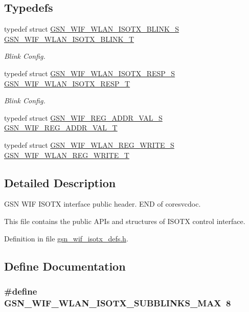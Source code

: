 \subsection*{Typedefs}
\begin{DoxyCompactItemize}
\item 
typedef struct \hyperlink{a00383}{GSN\_\-WIF\_\-WLAN\_\-ISOTX\_\-BLINK\_\-S} \hyperlink{a00611_aa5106f5574b37c3ad57646e430fd02cd}{GSN\_\-WIF\_\-WLAN\_\-ISOTX\_\-BLINK\_\-T}
\begin{DoxyCompactList}\small\item\em Blink Config. \end{DoxyCompactList}\item 
typedef struct \hyperlink{a00384}{GSN\_\-WIF\_\-WLAN\_\-ISOTX\_\-RESP\_\-S} \hyperlink{a00611_ab22302300b256ca3328249fa728e3bb7}{GSN\_\-WIF\_\-WLAN\_\-ISOTX\_\-RESP\_\-T}
\begin{DoxyCompactList}\small\item\em Blink Config. \end{DoxyCompactList}\item 
typedef struct \hyperlink{a00343}{GSN\_\-WIF\_\-REG\_\-ADDR\_\-VAL\_\-S} \hyperlink{a00611_a906005e2909b6c0c567780b355483f49}{GSN\_\-WIF\_\-REG\_\-ADDR\_\-VAL\_\-T}
\item 
typedef struct \hyperlink{a00394}{GSN\_\-WIF\_\-WLAN\_\-REG\_\-WRITE\_\-S} \hyperlink{a00611_a7ce83264f6ee8297b7b8757ae3820c18}{GSN\_\-WIF\_\-WLAN\_\-REG\_\-WRITE\_\-T}
\end{DoxyCompactItemize}


\subsection{Detailed Description}
GSN WIF ISOTX interface public header. END of coresvcdoc.

This file contains the public APIs and structures of ISOTX control interface. 

Definition in file \hyperlink{a00611_source}{gsn\_\-wif\_\-isotx\_\-defs.h}.



\subsection{Define Documentation}
\hypertarget{a00611_a65dca056006c9a81dd956396702f505f}{
\subsubsection[{GSN\_\-WIF\_\-WLAN\_\-ISOTX\_\-SUBBLINKS\_\-MAX}]{\setlength{\rightskip}{0pt plus 5cm}\#define GSN\_\-WIF\_\-WLAN\_\-ISOTX\_\-SUBBLINKS\_\-MAX~8}}
\label{a00611_a65dca056006c9a81dd956396702f505f}


